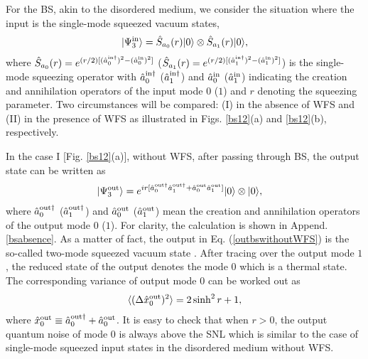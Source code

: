 \documentclass[9pt,twocolumn,twoside]{osajnl}
\begin{document}
For the BS, akin to the disordered medium, we consider the situation where the input is the single-mode squeezed vacuum states,
\begin{align}
|\Psi^{\rm{in}}_3\rangle = \hat{S}_{a_0}(r)|0\rangle \otimes \hat{S}_{a_1}(r)|0\rangle,
\end{align}
where $\hat{S}_{a_0}(r) = e^{(r/2) [(\hat{a}_0^{\rm{in}\dagger})^{ 2}-  (\hat{a}_0^{\rm{in} })^2]}$ ($\hat{S}_{a_1}(r) = e^{(r/2) [(\hat{a}_1^{\rm{in}\dagger})^{ 2}-  (\hat{a}_1^{\rm{in} })^2]}$) is the single-mode squeezing operator with $\hat{a}_0^{\rm{in} \dagger}$ ($\hat{a}_1^{\rm{in} \dagger}$) and $\hat{a}_0^{\rm{in}}$ ($\hat{a}_1^{\rm{in}}$) indicating the creation and annihilation operators of the input mode $0$ ($1$) and $r$ denoting the squeezing parameter. Two circumstances will be compared: (I) in the absence of WFS and (II) in the presence of WFS as illustrated in Figs. \ref{bs12}(a) and \ref{bs12}(b), respectively.

In the case I [Fig. \ref{bs12}(a)], without WFS, after passing through BS, the output state can be written as
\begin{align}
\label{outbswithoutWFS}
|\Psi^{\rm{out}}_3\rangle &= e^{i r [\hat{a}_0^{\rm{out}\dagger} \hat{a}_1^{\rm{out}\dagger} +  \hat{a}_0^{\rm{out} } \hat{a}_1^{\rm{out} }]}|0\rangle \otimes |0\rangle,
\end{align}
where $\hat{a}_0^{\rm{out} \dagger}$ ($\hat{a}_1^{\rm{out} \dagger}$) and $\hat{a}_0^{\rm{out}}$ ($\hat{a}_1^{\rm{out}}$) mean the creation and annihilation operators of the output mode $0$ ($1$). For clarity, the calculation is shown in Append. \ref{bsabsence}. As a matter of fact, the output in Eq. (\ref{outbswithoutWFS}) is the so-called two-mode squeezed vacuum state \cite{barnett2002}. After tracing over the output mode $1$, the reduced state of the output denotes the mode $0$ which is a thermal state. The corresponding variance of output mode $0$ can be worked out as
\begin{align}
\label{plus2r}
\langle (\Delta \hat{x}_{0}^{\rm{out}})^2 \rangle = 2 \sinh^2 r + 1 ,
\end{align} 
where $\hat{x}_{0}^{\rm{out}} \equiv \hat{a}_{0}^{\rm{out} \dagger} + \hat{a}_{0}^{\rm{out}}$. It is easy to check that when $r>0$, the output quantum noise of mode $0$ is always above the SNL which is similar to the case of single-mode squeezed input states in the disordered medium without WFS. 
\end{document}
